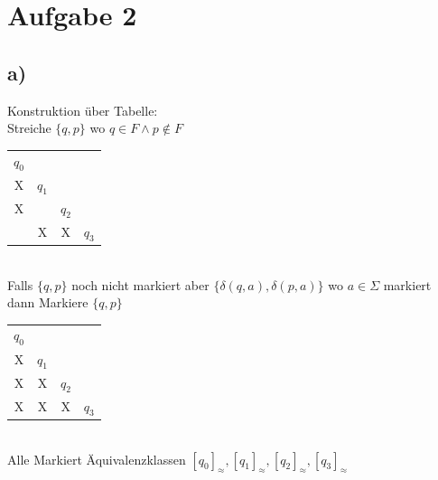 \section*{Aufgabe 2}

\subsection*{a)}
Konstruktion über Tabelle:\\
Streiche $\{q,p\}$ wo $q \in F \wedge p \not \in F$ \\
\begin{tabular}{c | c | c | c }
$q_0$ \\
X& $q_1$ \\
X&& $q_2$ \\
&X&X& $q_3$ \\
\end{tabular}\\
Falls $\{q,p\}$ noch nicht markiert aber $\{\delta(q,a), \delta(p,a)\}$ wo $a \in \Sigma$ markiert dann Markiere $\{q,p\}$ \\
\begin{tabular}{c | c | c | c }
$q_0$ \\
X& $q_1$ \\
X&X& $q_2$ \\
X&X&X& $q_3$ \\
\end{tabular}\\
Alle Markiert Äquivalenzklassen $[q_0]_{\approx},[q_1]_{\approx},[q_2]_{\approx},[q_3]_{\approx} $

